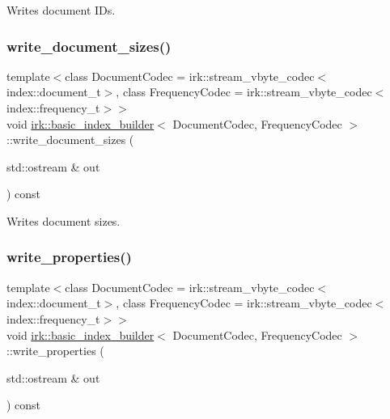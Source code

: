 Writes document I\+Ds. 

\mbox{\label{classirk_1_1basic__index__builder_a19f7a4ae586c56956966dbc1a854e105}} 
\subsubsection{\texorpdfstring{write\+\_\+document\+\_\+sizes()}{write\_document\_sizes()}}
{\footnotesize\ttfamily template$<$class Document\+Codec  = irk\+::stream\+\_\+vbyte\+\_\+codec$<$index\+::document\+\_\+t$>$, class Frequency\+Codec  = irk\+::stream\+\_\+vbyte\+\_\+codec$<$index\+::frequency\+\_\+t$>$$>$ \\
void \mbox{\hyperlink{classirk_1_1basic__index__builder}{irk\+::basic\+\_\+index\+\_\+builder}}$<$ Document\+Codec, Frequency\+Codec $>$\+::write\+\_\+document\+\_\+sizes (\begin{DoxyParamCaption}\item[{std\+::ostream \&}]{out }\end{DoxyParamCaption}) const\hspace{0.3cm}{\ttfamily [inline]}}



Writes document sizes. 

\mbox{\label{classirk_1_1basic__index__builder_ab5449278bf35ebae604a9caf12180657}} 
\subsubsection{\texorpdfstring{write\+\_\+properties()}{write\_properties()}}
{\footnotesize\ttfamily template$<$class Document\+Codec  = irk\+::stream\+\_\+vbyte\+\_\+codec$<$index\+::document\+\_\+t$>$, class Frequency\+Codec  = irk\+::stream\+\_\+vbyte\+\_\+codec$<$index\+::frequency\+\_\+t$>$$>$ \\
void \mbox{\hyperlink{classirk_1_1basic__index__builder}{irk\+::basic\+\_\+index\+\_\+builder}}$<$ Document\+Codec, Frequency\+Codec $>$\+::write\+\_\+properties (\begin{DoxyParamCaption}\item[{std\+::ostream \&}]{out }\end{DoxyParamCaption}) const\hspace{0.3cm}{\ttfamily [inline]}}



